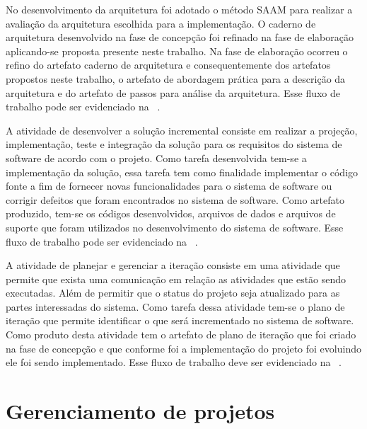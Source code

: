 No desenvolvimento da arquitetura foi adotado o método \acrfull{SAAM} para realizar a avaliação da arquitetura escolhida para a implementação. O caderno de arquitetura desenvolvido na fase de concepção foi refinado na fase de elaboração aplicando-se proposta presente neste trabalho. Na fase de elaboração ocorreu o refino do artefato caderno de arquitetura e consequentemente dos artefatos propostos neste trabalho, o artefato de abordagem prática para a descrição da arquitetura e  do artefato de passos para análise da arquitetura. Esse fluxo de trabalho pode ser evidenciado na ~.

%


%

A atividade de desenvolver a solução incremental consiste em realizar a projeção, implementação, teste e integração da solução para os requisitos do sistema de software de acordo com o projeto. Como tarefa desenvolvida tem-se a implementação da solução, essa tarefa tem como finalidade implementar o código fonte a fim de fornecer novas funcionalidades para o sistema de software ou corrigir defeitos que foram encontrados no sistema de software. Como artefato produzido, tem-se os códigos desenvolvidos, arquivos de dados e arquivos de suporte que foram utilizados no desenvolvimento do sistema de software. Esse fluxo de trabalho pode ser evidenciado na ~.


%

A atividade de planejar e gerenciar a iteração consiste em uma atividade que permite que exista uma comunicação em relação as atividades que estão sendo executadas. Além de permitir que o status do projeto seja atualizado para as partes interessadas do sistema. Como tarefa dessa atividade tem-se o plano de iteração que permite identificar o que será incrementado no sistema de software. Como produto desta atividade tem o artefato de plano de iteração que foi criado na fase de concepção e que conforme foi a implementação do projeto foi evoluindo ele foi sendo implementado. Esse fluxo de trabalho deve ser evidenciado na ~.

\section{Gerenciamento de projetos}


